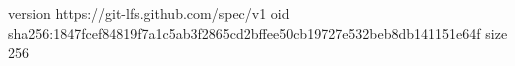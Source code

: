 version https://git-lfs.github.com/spec/v1
oid sha256:1847fcef84819f7a1c5ab3f2865cd2bffee50cb19727e532beb8db141151e64f
size 256
